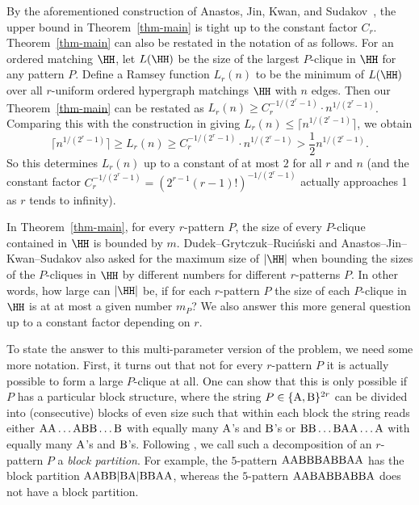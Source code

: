 By the aforementioned construction of Anastos, Jin, Kwan, and Sudakov~\cite[Theorem 1.7]{AJKS}, the upper bound in Theorem~\ref{thm-main} is tight up to the constant factor $C_r$. Theorem~\ref{thm-main} can also be restated in the notation of \cite{AJKS} as follows. For an ordered matching $\HH$, let $L(\HH)$ be the size of the largest $P$-clique in $\HH$ for any pattern $P$. Define a Ramsey function $L_r(n)$ to be the minimum of $L(\HH)$ over all $r$-uniform ordered hypergraph matchings $\HH$ with $n$ edges. Then our Theorem~\ref{thm-main} can be restated as $L_r(n) \ge C_r^{-1/(2^r-1)}\cdot n^{1/(2^r-1)}$. Comparing this with the construction in \cite{AJKS} giving $L_r(n) \le \lceil n^{1/(2^r-1)} \rceil$, we obtain
$$
\lceil n^{1/(2^r-1)} \rceil \ge L_r(n) \ge C_r^{-1/(2^r-1)}\cdot n^{1/(2^r-1)}  > \frac{1}{2}n^{1/(2^r-1)}.
$$
So this determines $L_r(n)$ up to a constant of at most $2$ for all $r$ and $n$ (and the constant factor $C_r^{-1/(2^r-1)}=(2^{r-1}(r-1)!)^{-1/(2^r-1)}$ actually approaches 1 as $r$ tends to infinity).

In Theorem~\ref{thm-main}, for every $r$-pattern $P$, the size of every $P$-clique contained in $\HH$ is bounded by $m$. Dudek--Grytczuk--Ruci\'{n}ski and Anastos--Jin--Kwan--Sudakov also asked for the maximum size of $|\HH|$ when bounding the sizes of the $P$-cliques in $\HH$ by different numbers for different $r$-patterns $P$. In other words, how large can $|\HH|$ be, if for each $r$-pattern $P$ the size of each $P$-clique in $\HH$ is at at most a given number $m_P$? We also answer this more general question up to a constant factor depending on $r$.

To state the answer to this multi-parameter version of the problem, we need some more notation. First, it turns out that not for every $r$-pattern $P$ it is actually possible to form a large $P$-clique at all. One can show that this is only possible if $P$ has a particular block structure, where the string $P\in\{{\rm A},{\rm B}\}^{2r}$ can be divided into (consecutive) blocks of even size such that within each block the string reads either $\rm{AA}\dots\rm{A}\rm {BB}\dots\rm{B}$ with equally many $\rm{A}$'s and $\rm{B}$'s or $\rm{BB}\dots\rm{B}\rm {AA}\dots\rm{A}$ with equally many $\rm{A}$'s and $\rm{B}$'s. Following \cite{AJKS}, we call such a decomposition of an $r$-pattern $P$ a \emph{block partition}. For example, the $5$-pattern $\rm{AABBBABBAA}$ has the block partition $\rm{AABB|BA|BBAA}$, whereas the $5$-pattern $\rm{AABABBABBA}$ does not have a block partition.

